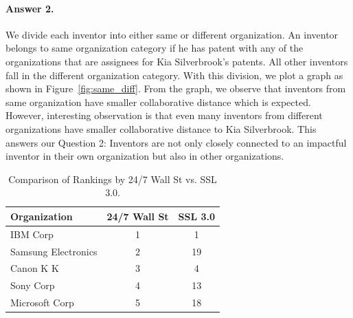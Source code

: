 \paragraph{Answer 2.}
We divide each inventor into either same 
or different organization. An inventor belongs to 
 same organization category if he has patent with any of the organizations that are 
assignees for Kia Silverbrook's patents. All other inventors fall in the different
organization category. With this division, 
we plot a graph as shown in Figure~\ref{fig:same_diff}.
From the graph, we observe that inventors from same organization have
smaller collaborative distance which is expected. However, interesting observation is that
even many inventors from different organizations have smaller collaborative distance to Kia Silverbrook. 
This answers our Question 2:
Inventors are not only closely connected to an impactful
inventor in their own organization but also in other organizations.



\begin{table}[t]
\centering
\begin{tabular}{|l|c|c|}
\hline
\textbf{Organization}        & \multicolumn{1}{l|}{\textbf{24/7 Wall St}} & \multicolumn{1}{l|}{\textbf{SSL 3.0}} \\ \hline
IBM Corp                     & 1                                          & 1                                         \\ \hline
Samsung Electronics          & 2                                          & 19                                        \\ \hline
Canon K K                    & 3                                          & 4                                         \\ \hline
Sony Corp                    & 4                                          & 13                                        \\ \hline
Microsoft Corp               & 5                                          & 18                                        \\ \hline
\end{tabular}
\caption{Comparison of Rankings by 24/7 Wall St vs. SSL 3.0.}
\label{tab:validation}
\end{table}


